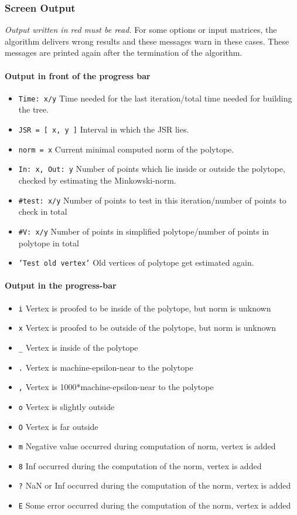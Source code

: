 \subsubsection{Screen Output}
\emph{\color{red} Output written in red must be read.}
For some options or input matrices, the algorithm delivers wrong results and these messages warn in these cases.
These messages are printed again after the termination of the algorithm.

\paragraph{Output in front of the progress bar}
\begin{itemize}[noitemsep]
\item \texttt{Time: x/y}       Time needed for the last iteration/total time needed for building the tree.
\item \texttt{JSR = [ x, y ]}  Interval in which the JSR lies.
\item \texttt{norm = x}        Current minimal computed norm of the polytope.
\item \texttt{In: x, Out: y}   Number of points which lie inside or outside the polytope, checked by estimating the Minkowski-norm.
\item \texttt{\#test: x/y}      Number of points to test in this iteration/number of points to check in total
\item \texttt{\#V: x/y}         Number of points in simplified polytope/number of points in polytope in total
\item \texttt{'Test old vertex'}  Old vertices of polytope get estimated again.
\end{itemize}
\paragraph{Output in the progress-bar}
\begin{itemize}[noitemsep]
\item \texttt{i}  Vertex is proofed to be inside of the polytope, but norm is unknown
\item \texttt{x}  Vertex is proofed to be outside of the polytope, but norm is unknown
\item \texttt{\_}  Vertex is inside of the polytope
\item \texttt{.}  Vertex is machine-epsilon-near to the polytope 
\item \texttt{,}  Vertex is 1000*machine-epsilon-near to the polytope
\item \texttt{o}  Vertex is slightly outside
\item \texttt{O}  Vertex is far outside
\item \texttt{m}  Negative value occurred during computation of norm, vertex is added
\item \texttt{8}  Inf occurred during the computation of the norm, vertex is added
\item \texttt{?}  NaN or Inf occurred during the computation of the norm, vertex is added
\item \texttt{E}  Some error occurred during the computation of the norm, vertex is added
\end{itemize}

